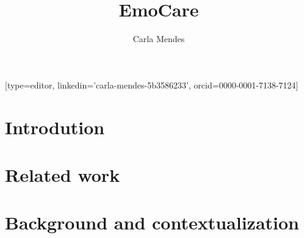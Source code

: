 \documentclass[a4paper,fleqn]{cas-dc}
\begin{document}
\let\WriteBookmarks\relax
\def\floatpagepagefraction{1}
\def\textpagefraction{.001}

\title [mode = title]{EmoCare}                     


\author[1]{Carla Mendes}[type=editor,
		linkedin='carla-mendes-5b3586233',
		orcid=0000-0001-7138-7124]

\address[1]{Computer Science and Communications Research Centre, School of Technology and Management, Polytechnic of Leiria, 2411-901 Leiria, Portugal}

\begin{abstract}



\end{abstract}

%

\begin{keywords}

\end{keywords}


\maketitle

\section{Introdution}
\label{introduction}

\section{Related work}
\label{relatedWork}

\section{Background and contextualization}
\label{backgroundContextualization}
\end{document}
